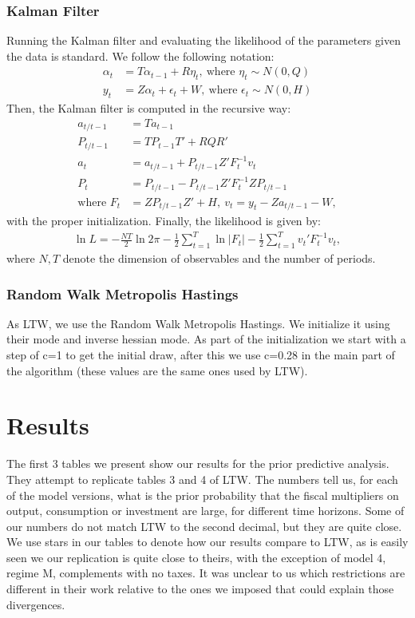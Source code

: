 \documentclass[letterpaper,12pt]{article}%
\begin{document}
\subsubsection*{Kalman Filter}
Running the Kalman filter and evaluating the likelihood of the parameters given the data is standard. We follow the following notation:
\begin{align*}
\alpha_t &= T \alpha_{t-1} + R \eta_t, \ \text{where } \eta_t \sim N(0,Q) \\
y_t &= Z \alpha_t + \epsilon_t + W, \ \text{where } \epsilon_t \sim N(0,H)
\end{align*}
Then, the Kalman filter is computed in the recursive way:
\begin{align*}
a_{t/t-1} &= T a_{t-1} \\
P_{t/t-1} &= T P_{t-1} T' + R Q R' \\
a_t &= a_{t/t-1} + P_{t/t-1} Z' F_t^{-1} v_t\\
P_t &= P_{t/t-1} - P_{t/t-1} Z' F_t^{-1} Z P_{t/t-1} \\
\text{where } F_t&= Z P_{t/t-1} Z' + H, \ v_t = y_t - Z a_{t/t-1} - W,
\end{align*}
with the proper initialization. Finally, the likelihood is given by:
\begin{align*}
\ln L = -\frac{NT}{2} \ln 2\pi - \frac{1}{2} \sum_{t=1}^{T} \ln |F_t| - \frac{1}{2} \sum_{t=1}^T v_t' F_t^{-1} v_t,
\end{align*}
where $N,T$ denote the dimension of observables and the number of periods.

\subsubsection{Random Walk Metropolis Hastings}
As LTW, we use the Random Walk Metropolis Hastings. We initialize it using their mode and inverse hessian mode. As part of the initialization we start with a step of c=1 to get the initial draw, after this we use c=0.28 in the main part of the algorithm (these values are the same ones used by LTW).

\section{Results}
The first 3 tables we present show our results for the prior predictive analysis. They attempt to replicate tables 3 and 4 of LTW. The numbers tell us, for each of the model versions, what is the prior probability that the fiscal multipliers on output, consumption or investment are large, for different time horizons. Some of our numbers do not match LTW to the second decimal, but they are quite close. We use stars in our tables to denote how our results compare to LTW, as is easily seen we our replication is quite close to theirs, with the exception of model 4, regime M, complements with no taxes. It was unclear to us which restrictions are different in their work relative to the ones we imposed that could explain those divergences.
\end{document}
